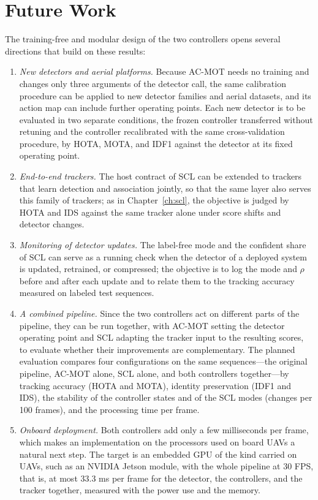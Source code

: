 \section{Future Work}\label{sec:conc-future}
The training-free and modular design of the two controllers opens several directions that build on these results:
\begin{enumerate}
\item \emph{New detectors and aerial platforms.} Because AC-MOT needs no training and changes only three arguments of the detector call, the same calibration procedure can be applied to new detector families and aerial datasets, and its action map can include further operating points. Each new detector is to be evaluated in two separate conditions, the frozen controller transferred without retuning and the controller recalibrated with the same cross-validation procedure, by HOTA, MOTA, and IDF1 against the detector at its fixed operating point.
\item \emph{End-to-end trackers.} The host contract of SCL can be extended to trackers that learn detection and association jointly, so that the same layer also serves this family of trackers; as in Chapter~\ref{ch:scl}, the objective is judged by HOTA and IDS against the same tracker alone under score shifts and detector changes.
\item \emph{Monitoring of detector updates.} The label-free mode and the confident share of SCL can serve as a running check when the detector of a deployed system is updated, retrained, or compressed; the objective is to log the mode and $\rho$ before and after each update and to relate them to the tracking accuracy measured on labeled test sequences.
\item \emph{A combined pipeline.} Since the two controllers act on different parts of the pipeline, they can be run together, with AC-MOT setting the detector operating point and SCL adapting the tracker input to the resulting scores, to evaluate whether their improvements are complementary. The planned evaluation compares four configurations on the same sequences---the original pipeline, AC-MOT alone, SCL alone, and both controllers together---by tracking accuracy (HOTA and MOTA), identity preservation (IDF1 and IDS), the stability of the controller states and of the SCL modes (changes per 100 frames), and the processing time per frame.
\item \emph{Onboard deployment.} Both controllers add only a few milliseconds per frame, which makes an implementation on the processors used on board UAVs a natural next step. The target is an embedded GPU of the kind carried on UAVs, such as an NVIDIA Jetson module, with the whole pipeline at 30 FPS, that is, at most 33.3 ms per frame for the detector, the controllers, and the tracker together, measured with the power use and the memory.
\end{enumerate}
